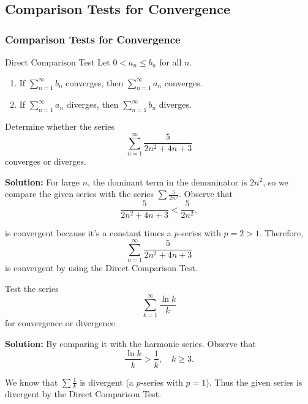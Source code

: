 \documentclass[12pt]{article}
\theoremstyle{beautifulthm}
\begin{document}
\newpage
\subsection{Comparison Tests
for Convergence}

\subsubsection{Comparison Tests
for Convergence}
\begin{mytheorem}{Direct Comparison Test}{}
Let $0 < a_n \leq b_n$ for all $n$.

\begin{enumerate}
    \item If $\sum_{n=1}^\infty b_n$ converges, then $\sum_{n=1}^\infty a_n$ converges.
    \item If $\sum_{n=1}^\infty a_n$ diverges, then $\sum_{n=1}^\infty b_n$ diverges.
\end{enumerate}
\end{mytheorem}


\begin{tcolorbox}[colback=examplebg, colframe=red!75!black, title=\textbf{EXAMPLE 1: Direct Comparison Test}, fonttitle=\bfseries, sharp corners]
Determine whether the series 
\[
\sum_{n=1}^\infty \frac{5}{2n^2 + 4n + 3}
\]
converges or diverges.



\tcblower
\textbf{Solution:} 
For large $n$, the dominant term in the denominator is $2n^2$, so we compare the given series with the series $\sum \frac{5}{2n^2}$. Observe that
\[
\frac{5}{2n^2 + 4n + 3} < \frac{5}{2n^2},
\]

is convergent because it’s a constant times a $p$-series with $p = 2 > 1$. Therefore,
\[
\sum_{n=1}^\infty \frac{5}{2n^2 + 4n + 3}
\]
is convergent by using the Direct Comparison Test.
\end{tcolorbox}



\begin{tcolorbox}[colback=examplebg, colframe=red!75!black, title=\textbf{EXAMPLE 2: Direct Comparison Test}, fonttitle=\bfseries, sharp corners]

Test the series 
\[
\sum_{k=1}^\infty \frac{\ln k}{k}
\]
for convergence or divergence.


\tcblower
\textbf{Solution:} 
By comparing it with the harmonic series. Observe that
\[
\frac{\ln k}{k} > \frac{1}{k}, \quad k \geq 3.
\]

We know that $\sum \frac{1}{k}$ is divergent (a $p$-series with $p = 1$). Thus the given series is divergent by the Direct Comparison Test.
\end{tcolorbox}
\end{document}

